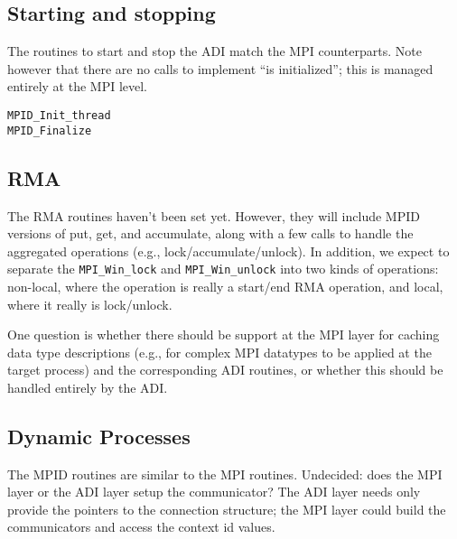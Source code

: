 \documentclass{article}
\def\code#1{\texttt{#1}}
\begin{document}
\subsection{Starting and stopping}
The routines to start and stop the ADI match the MPI counterparts.
Note however that there are no calls to implement ``is initialized'';
this is managed entirely at the MPI level.
\begin{verbatim}
MPID_Init_thread
MPID_Finalize
\end{verbatim}

\subsection{RMA}
The RMA routines haven't been set yet.  However, they will include
MPID versions of put, get, and accumulate, along with a few calls to
handle the aggregated operations (e.g., lock/accumulate/unlock).
In addition, we expect to separate the \code{MPI_Win_lock} and
\code{MPI_Win_unlock} into two kinds of operations: non-local, where
the operation is really a start/end RMA operation, and local, where it
really is lock/unlock.

One question is whether there should be support at the MPI layer for
caching data type descriptions (e.g., for complex MPI datatypes to be
applied at the target process) and the corresponding ADI routines, or
whether this should be handled entirely by the ADI.

\subsection{Dynamic Processes}
The MPID routines are similar to the MPI routines.  Undecided: does
the MPI layer or the ADI layer setup the communicator?  The ADI layer
needs only provide the pointers to the connection structure; the MPI
layer could build the communicators and access the context id values.
\end{document}
